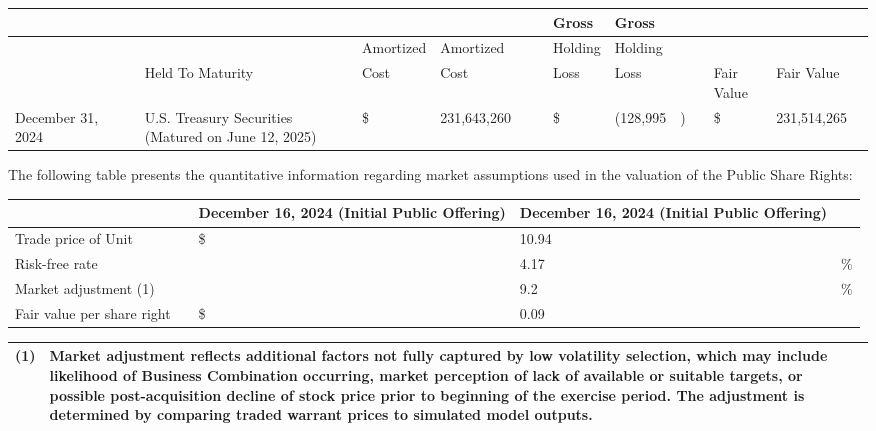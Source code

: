 \documentclass[11pt,a4paper]{article}
\begin{document}
\begin{table}[h]
\begin{tabular}{|l|l|l|l|l|l|l|l|l|l|l|l|l|l|l|l|}
\hline
 &  &  &  &  &  &  &  &  & Gross & Gross &  &  &  &  &  \\ \hline
 &  &  &  &  & Amortized & Amortized &  &  & Holding & Holding &  &  &  &  &  \\ \hline
 &  &  & Held To Maturity &  & Cost & Cost &  &  & Loss & Loss &  &  & Fair Value & Fair Value &  \\ \hline
December 31, 2024 &  &  & U.S. Treasury Securities (Matured on June 12, 2025) &  & \$ & 231,643,260 &  &  & \$ & (128,995 & ) &  & \$ & 231,514,265 &  \\ \hline
\end{tabular}
\end{table}

The following table presents the quantitative information regarding market assumptions used in the valuation of the Public Share Rights:

\begin{table}[h]
\begin{tabular}{|l|l|l|l|l|}
\hline
 &  & \textbf{December 16, 2024}  \textbf{(Initial Public Offering)} & \textbf{December 16, 2024}  \textbf{(Initial Public Offering)} &  \\ \hline
Trade price of Unit &  & \$ & 10.94 &  \\ \hline
Risk-free rate &  &  & 4.17 & \% \\ \hline
Market adjustment (1) &  &  & 9.2 & \% \\ \hline
Fair value per share right &  & \$ & 0.09 &  \\ \hline
\end{tabular}
\end{table}

\begin{table}[h]
\begin{tabular}{|l|l|}
\hline
(1) & Market adjustment reflects additional factors not fully captured by low volatility selection, which may include likelihood of Business Combination occurring, market perception of lack of available or suitable targets, or possible post-acquisition decline of stock price prior to beginning of the exercise period. The adjustment is determined by comparing traded warrant prices to simulated model outputs. \\ \hline
\end{tabular}
\end{table}
\end{document}
